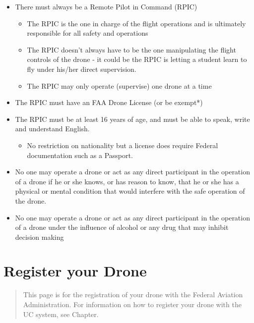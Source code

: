 \documentclass[
]{book}
\providecommand{\tightlist}{%
  \setlength{\itemsep}{0pt}\setlength{\parskip}{0pt}}
\begin{document}
\begin{itemize}
\tightlist
\item
  There must always be a Remote Pilot in Command (RPIC)

  \begin{itemize}
  \tightlist
  \item
    The RPIC is the one in charge of the flight operations and is ultimately responsible for all safety and operations
  \item
    The RPIC doesn't always have to be the one manipulating the flight controls of the drone - it could be the RPIC is letting a student learn to fly under his/her direct supervision.
  \item
    The RPIC may only operate (supervise) one drone at a time
  \end{itemize}
\item
  The RPIC must have an FAA Drone License (or be exempt*)
\item
  The RPIC must be at least 16 years of age, and must be able to speak, write and understand English.

  \begin{itemize}
  \tightlist
  \item
    No restriction on nationality but a license does require Federal documentation such as a Passport.
  \end{itemize}
\item
  No one may operate a drone or act as any direct participant in the operation of a drone if he or she knows, or has reason to know, that he or she has a physical or mental condition that would interfere with the safe operation of the drone.
\item
  No one may operate a drone or act as any direct participant in the operation of a drone under the influence of alcohol or any drug that may inhibit decision making
\end{itemize}

\hypertarget{ch-register}{%
\chapter{Register your Drone}\label{ch-register}}

\begin{quote}
This page is for the registration of your drone with the Federal Aviation Administration. For information on how to register your drone with the UC system, see Chapter.
\end{quote}
\end{document}

